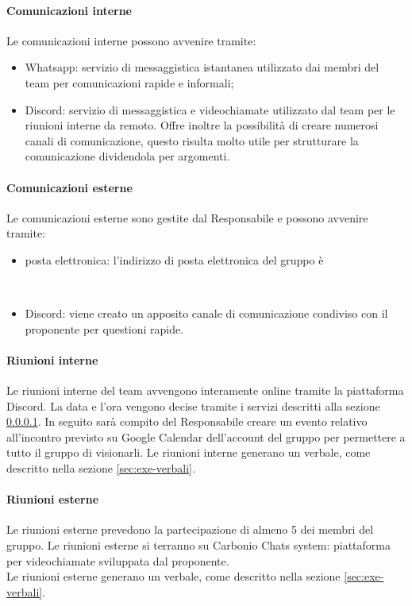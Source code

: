     \paragraph{Comunicazioni interne} \label{sec:com-interne}
    Le comunicazioni interne possono avvenire tramite:
        \begin{itemize}
            \item Whatsapp: servizio di messaggistica istantanea utilizzato dai membri del team per comunicazioni rapide e informali;
            \item Discord: servizio di messaggistica e videochiamate utilizzato dal team per le riunioni interne da remoto. Offre inoltre la possibilità di creare numerosi canali di comunicazione, questo risulta molto utile per strutturare la comunicazione dividendola per argomenti.  
        \end{itemize}

    \paragraph{Comunicazioni esterne}
    Le comunicazioni esterne sono gestite dal Responsabile e possono avvenire tramite:
    \begin{itemize}
        \item posta elettronica: l'indirizzo di posta elettronica del gruppo è
        \begin{center}
            \mailtoQBS\\[0.3cm]
        \end{center} 
        \item Discord: viene creato un apposito canale di comunicazione condiviso con il proponente per questioni rapide.
    \end{itemize}

    \paragraph{Riunioni interne}
    Le riunioni interne del team avvengono interamente online tramite la piattaforma Discord. La data e l'ora vengono decise tramite i servizi descritti alla sezione \ref{sec:com-interne}. In seguito sarà compito del Responsabile creare un evento relativo all'incontro previsto su Google Calendar dell'account del gruppo per permettere a tutto il gruppo di visionarli.
    Le riunioni interne generano un verbale, come descritto nella sezione \ref{sec:exe-verbali}.

    \paragraph{Riunioni esterne}
    Le riunioni esterne prevedono la partecipazione di almeno 5 dei membri del gruppo. Le riunioni esterne si terranno su Carbonio Chats system: piattaforma per videochiamate sviluppata dal proponente.\\
    Le riunioni esterne generano un verbale, come descritto nella sezione \ref{sec:exe-verbali}.

